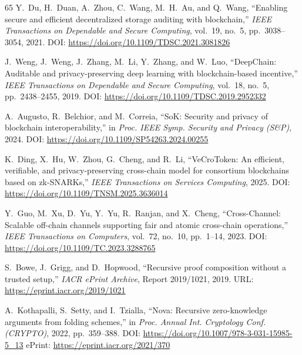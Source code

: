 \documentclass[journal]{IEEEtran}
\begin{document}
\begin{thebibliography}{65}
Y.~Du, H.~Duan, A.~Zhou, C.~Wang, M.~H.~Au, and Q.~Wang,
``Enabling secure and efficient decentralized storage auditing with
blockchain,''
\textit{IEEE Transactions on Dependable and Secure Computing}, vol.~19, no.~5,
pp.~3038--3054, 2021.
\newblock DOI: \url{https://doi.org/10.1109/TDSC.2021.3081826}

J.~Weng, J.~Weng, J.~Zhang, M.~Li, Y.~Zhang, and W.~Luo,
``DeepChain: Auditable and privacy-preserving deep learning with
blockchain-based incentive,''
\textit{IEEE Transactions on Dependable and Secure Computing}, vol.~18, no.~5,
pp.~2438--2455, 2019.
\newblock DOI: \url{https://doi.org/10.1109/TDSC.2019.2952332}

A.~Augusto, R.~Belchior, and M.~Correia,
``SoK: Security and privacy of blockchain interoperability,''
in \textit{Proc. IEEE Symp. Security and Privacy (S\&P)}, 2024.
\newblock DOI: \url{https://doi.org/10.1109/SP54263.2024.00255}

K.~Ding, X.~Hu, W.~Zhou, G.~Cheng, and R.~Li,
``VeCroToken: An efficient, verifiable, and privacy-preserving cross-chain
model for consortium blockchains based on zk-SNARKs,''
\textit{IEEE Transactions on Services Computing}, 2025.
\newblock DOI: \url{https://doi.org/10.1109/TNSM.2025.3636014}

Y.~Guo, M.~Xu, D.~Yu, Y.~Yu, R.~Ranjan, and X.~Cheng,
``Cross-Channel: Scalable off-chain channels supporting fair and atomic
cross-chain operations,''
\textit{IEEE Transactions on Computers}, vol.~72, no.~10, pp.~1--14, 2023.
\newblock DOI: \url{https://doi.org/10.1109/TC.2023.3288765}


S.~Bowe, J.~Grigg, and D.~Hopwood,
``Recursive proof composition without a trusted setup,''
\textit{IACR ePrint Archive}, Report 2019/1021, 2019.
\newblock URL: \url{https://eprint.iacr.org/2019/1021}

A.~Kothapalli, S.~Setty, and I.~Tzialla,
``Nova: Recursive zero-knowledge arguments from folding schemes,''
in \textit{Proc. Annual Int. Cryptology Conf. (CRYPTO)}, 2022,
pp.~359--388.
\newblock DOI: \url{https://doi.org/10.1007/978-3-031-15985-5_13}
\newblock ePrint: \url{https://eprint.iacr.org/2021/370}


\end{thebibliography}
\end{document}
